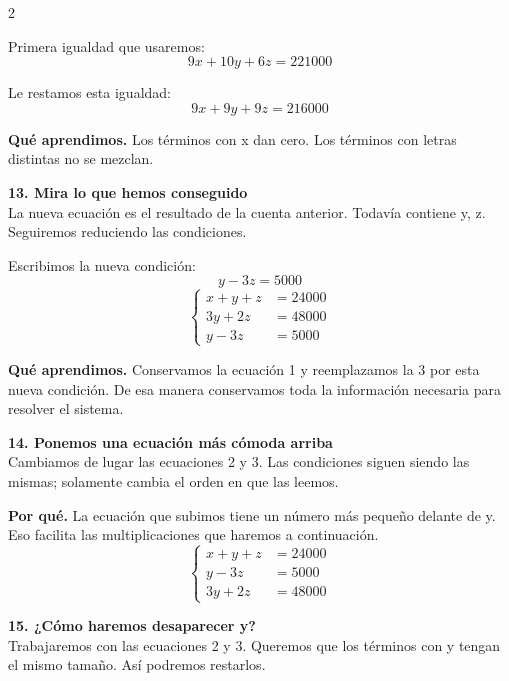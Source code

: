 \documentclass[11pt,a4paper,landscape]{article}
\begin{document}
\begin{multicols*}{2}
\begin{minipage}{\linewidth}
\par\smallskip Primera igualdad que usaremos:
\[9x + 10y + 6z = 221000\]
\par\smallskip Le restamos esta igualdad:
\[9x + 9y + 9z = 216000\]
\par\smallskip\textbf{Qué aprendimos.} Los términos con x dan cero. Los términos con letras distintas no se mezclan.
\end{minipage}\par\medskip
\noindent\begin{minipage}{\linewidth}\textbf{13. Mira lo que hemos conseguido}\\[2pt]La nueva ecuación es el resultado de la cuenta anterior. Todavía contiene y, z. Seguiremos reduciendo las condiciones.
\par\smallskip Escribimos la nueva condición:
\[y - 3z = 5000\]
\[\left\{\begin{aligned}x + y + z &= 24000\\3y + 2z &= 48000\\y - 3z &= 5000\end{aligned}\right.\]
\par\smallskip\textbf{Qué aprendimos.} Conservamos la ecuación 1 y reemplazamos la 3 por esta nueva condición. De esa manera conservamos toda la información necesaria para resolver el sistema.
\end{minipage}\par\medskip
\noindent\begin{minipage}{\linewidth}\textbf{14. Ponemos una ecuación más cómoda arriba}\\[2pt]Cambiamos de lugar las ecuaciones 2 y 3. Las condiciones siguen siendo las mismas; solamente cambia el orden en que las leemos.
\par\smallskip\textbf{Por qué.} La ecuación que subimos tiene un número más pequeño delante de y. Eso facilita las multiplicaciones que haremos a continuación.
\[\left\{\begin{aligned}x + y + z &= 24000\\y - 3z &= 5000\\3y + 2z &= 48000\end{aligned}\right.\]
\end{minipage}\par\medskip
\noindent\begin{minipage}{\linewidth}\textbf{15. ¿Cómo haremos desaparecer y?}\\[2pt]Trabajaremos con las ecuaciones 2 y 3. Queremos que los términos con y tengan el mismo tamaño. Así podremos restarlos.

\end{minipage}
\end{multicols*}
\end{document}
